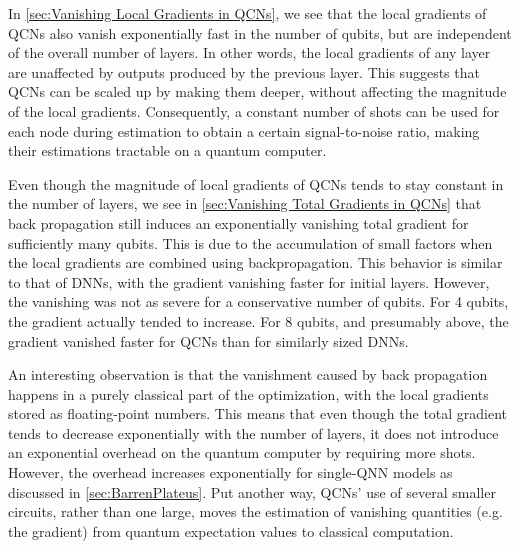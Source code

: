 In \autoref{sec:Vanishing Local Gradients in QCNs}, we see that the local gradients of QCNs also vanish exponentially fast in the number of qubits, but are independent of the overall number of layers. In other words, the local gradients of any layer are unaffected by outputs produced by the previous layer. This suggests that QCNs can be scaled up by making them deeper, without affecting the magnitude of the local gradients. Consequently, a constant number of shots can be used for each node during estimation to obtain a certain signal-to-noise ratio, making their estimations tractable on a quantum computer. 

Even though the magnitude of local gradients of QCNs tends to stay constant in the number of layers, we see in \autoref{sec:Vanishing Total Gradients in QCNs} that back propagation still induces an exponentially vanishing total gradient for sufficiently many qubits. This is due to the accumulation of small factors when the local gradients are combined using backpropagation. This behavior is similar to that of DNNs, with the gradient vanishing faster for initial layers. However, the vanishing was not as severe for a conservative number of qubits. For 4 qubits, the gradient actually tended to increase. For 8 qubits, and presumably above, the gradient vanished faster for QCNs than for similarly sized DNNs.  

An interesting observation is that the vanishment caused by back propagation happens in a purely classical part of the optimization, with the local gradients stored as floating-point numbers. This means that even though the total gradient tends to decrease exponentially with the number of layers, it does not introduce an exponential overhead on the quantum computer by requiring more shots. However, the overhead increases exponentially for single-QNN models as discussed in \autoref{sec:BarrenPlateus}. Put another way, QCNs' use of several smaller circuits, rather than one large, moves the estimation of vanishing quantities (e.g. the gradient) from quantum expectation values to classical computation. 



